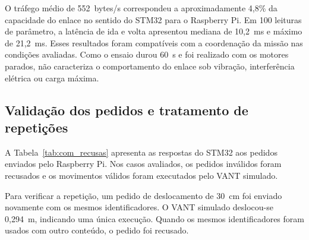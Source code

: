 O tráfego médio de 552~bytes/s correspondeu a aproximadamente 4,8\% da capacidade do enlace no sentido do STM32 para o Raspberry Pi. Em 100 leituras de parâmetro, a latência de ida e volta apresentou mediana de 10,2~ms e máximo de 21,2~ms. Esses resultados foram compatíveis com a coordenação da missão nas condições avaliadas. Como o ensaio durou 60~s e foi realizado com os motores parados, não caracteriza o comportamento do enlace sob vibração, interferência elétrica ou carga máxima.

\subsection{Validação dos pedidos e tratamento de repetições}\label{subsec:res_com_recusas}

A Tabela~\ref{tab:com_recusas} apresenta as respostas do STM32 aos pedidos enviados pelo Raspberry Pi. Nos casos avaliados, os pedidos inválidos foram recusados e os movimentos válidos foram executados pelo VANT simulado.

Para verificar a repetição, um pedido de deslocamento de 30~cm foi enviado novamente com os mesmos identificadores. O VANT simulado deslocou-se 0,294~m, indicando uma única execução. Quando os mesmos identificadores foram usados com outro conteúdo, o pedido foi recusado.

